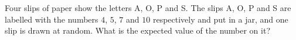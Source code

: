 Four slips of paper show the letters A, O, P and S. The slips A, O, P and S are labelled with the numbers $4$, $5$, $7$ and $10$ respectively and put in a jar, and one slip is drawn at random. What is the expected value of the number on it?
